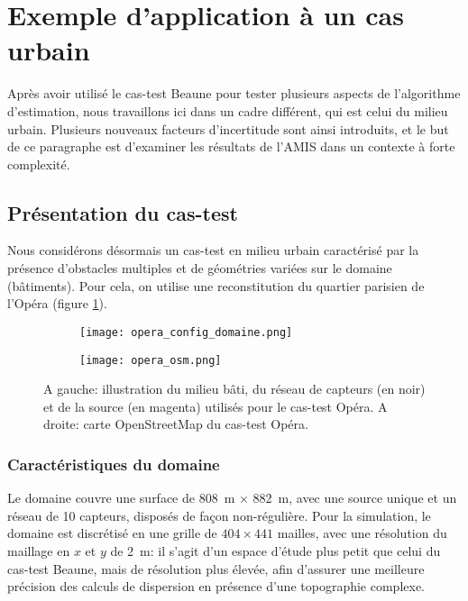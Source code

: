 \section{Exemple d'application à un cas urbain}

Après avoir utilisé le cas-test Beaune pour tester plusieurs aspects de l'algorithme d'estimation, nous travaillons ici dans un cadre différent, qui est celui du milieu urbain. Plusieurs nouveaux facteurs d'incertitude sont ainsi introduits, et le but de ce paragraphe est d'examiner les résultats de l'AMIS dans un contexte à forte complexité.\\

\subsection{Présentation du cas-test}

Nous considérons désormais un cas-test en milieu urbain caractérisé par la présence d'obstacles multiples et de géométries variées sur le domaine (bâtiments). Pour cela, on utilise une reconstitution du quartier parisien de l'Opéra (figure \ref{fig_opera_config}).\\



\begin{figure}[h!]
	\centering
	\begin{subfigure}[t]{0.5\textwidth}
		\centering
		\texttt{[image: opera\_config\_domaine.png]}
		\caption{}
		\label{fig_opera_config}
	\end{subfigure}%
	\begin{subfigure}[t]{0.5\textwidth}
		\centering
		\texttt{[image: opera\_osm.png]}
		\caption{}
		\label{fig_opera_carte}
	\end{subfigure}
	\caption{A gauche: illustration du milieu bâti, du réseau de capteurs (en noir) et de la source (en magenta) utilisés pour le cas-test Opéra. A droite: carte OpenStreetMap du cas-test Opéra.}
	\label{fig_opera_presentation}
\end{figure}

\subsubsection{Caractéristiques du domaine}
Le domaine couvre une surface de \SI{808}{\meter} $\times$ \SI{882}{\meter}, avec une source unique et un réseau de 10 capteurs, disposés de façon non-régulière. Pour la simulation, le domaine est discrétisé en une grille de $404 \times 441$ mailles, avec une résolution du maillage en $x$ et $y$ de \SI{2}{\meter}: il s'agit d'un espace d'étude plus petit que celui du cas-test Beaune, mais de résolution plus élevée, afin d'assurer une meilleure précision des calculs de dispersion en présence d'une topographie complexe. \\


